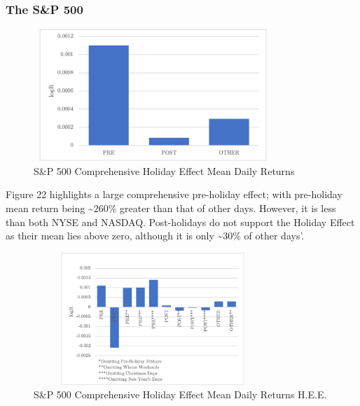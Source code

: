 \documentclass[11pt, english]{article}
\begin{document}
		\subsubsection{The S\&P 500}

	\begin{figure}[H]
        \begin{center}
                \includegraphics[width=9cm,height=5cm]{SP-HE1.png} 
		\caption{S\&P 500 Comprehensive Holiday Effect Mean Daily Returns}
        \end{center}
        \end{figure}

	Figure 22 highlights a large comprehensive pre-holiday effect; with pre-holiday mean return being \~{}260\% greater than that of other days. However, it is less than both NYSE and NASDAQ. Post-holidays do not support the Holiday Effect as their mean lies above zero, although it is only \~{}30\% of other days'.

	\begin{figure}[H]
        \begin{center}
                \includegraphics[width=9cm,height=5cm]{SP-HE2.png} 
		\caption{S\&P 500 Comprehensive Holiday Effect Mean Daily Returns H.E.E.}
        \end{center}
        \end{figure}
\end{document}

